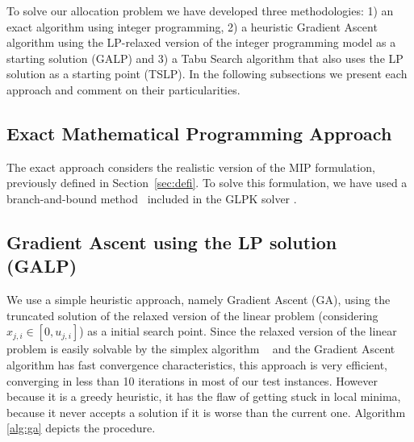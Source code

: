 To solve our allocation problem we have developed three methodologies: 1) an exact algorithm
using integer programming, 2) a heuristic Gradient Ascent algorithm using the LP-relaxed version of the integer
programming model as a starting solution (GALP) and 3) a Tabu Search
algorithm that also uses the LP solution as a starting point (TSLP). In the following subsections we present each approach and comment on their particularities.

%
%
%

\subsection{Exact Mathematical Programming Approach}
The exact approach considers the realistic version of the 
MIP formulation, previously defined in Section~\ref{sec:defi}.
To solve this formulation, we have used a branch-and-bound method~\cite{lawler1966branch}
included in the GLPK solver \cite{GLPK}.

\subsection{Gradient Ascent using the LP solution (GALP)}
We use a simple heuristic approach, namely Gradient Ascent (GA), using
the truncated solution of the relaxed version of the linear problem (considering $x_{j,i} \in [0,u_{j,i}]$) as a initial search point.
Since the relaxed version of the linear problem is easily solvable by the simplex 
algorithm ~\cite{dantzig1955generalized} and the Gradient Ascent algorithm has 
fast convergence characteristics, this approach is very efficient, 
converging in less than 10 iterations in most of our test instances. 
However because it is a greedy heuristic, it has the flaw of getting stuck in local minima,
because it never accepts a solution if it is worse than the current one.
Algorithm \ref{alg:ga} depicts the procedure.

